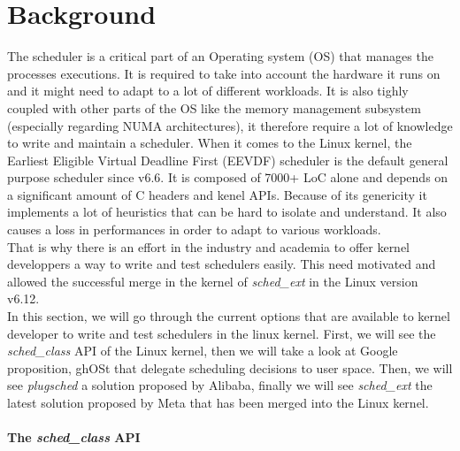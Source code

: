 \section{Background}

\par The scheduler is a critical part of an Operating system (OS) that manages the processes executions. It is required to take into account the hardware it runs on and it might need to adapt to a lot of different workloads. It is also tighly coupled with other parts of the OS like the memory management subsystem (especially regarding NUMA architectures), it therefore require a lot of knowledge to write and maintain a scheduler. When it comes to the Linux kernel, the Earliest Eligible Virtual Deadline First (EEVDF) scheduler is the default general purpose scheduler since v6.6. It is composed of 7000+ LoC alone and depends on a significant amount of C headers and kenel APIs. Because of its genericity it implements a lot of heuristics that can be hard to isolate and understand. It also causes a loss in performances in order to adapt to various workloads. \\


That is why there is an effort in the industry and academia to offer kernel developpers a way to write and test schedulers easily. This need motivated and allowed the successful merge in the kernel of \textit{sched\_ext} in the Linux version v6.12. \\
In this section, we will go through the current options that are available to kernel developer to write and test schedulers in the linux kernel. First, we will see the \textit{sched\_class} API of the Linux kernel, then we will take a look at Google proposition, ghOSt\cite{ghost-paper} that delegate scheduling decisions to user space. Then, we will see \textit{plugsched} a solution proposed by Alibaba, finally we will see \textit{sched\_ext} the latest solution proposed by Meta that has been merged into the Linux kernel.

\paragraph{The \textit{sched\_class} API}


